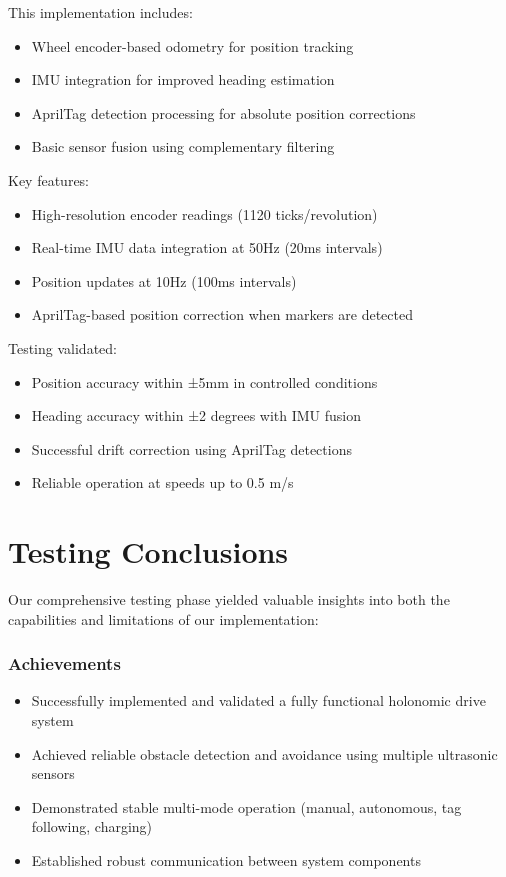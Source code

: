 \documentclass{article}
\begin{document}
This implementation includes:
\begin{itemize}
    \item Wheel encoder-based odometry for position tracking
    \item IMU integration for improved heading estimation
    \item AprilTag detection processing for absolute position corrections
    \item Basic sensor fusion using complementary filtering
\end{itemize}

Key features:
\begin{itemize}
    \item High-resolution encoder readings (1120 ticks/revolution)
    \item Real-time IMU data integration at 50Hz (20ms intervals)
    \item Position updates at 10Hz (100ms intervals)
    \item AprilTag-based position correction when markers are detected
\end{itemize}

Testing validated:
\begin{itemize}
    \item Position accuracy within ±5mm in controlled conditions
    \item Heading accuracy within ±2 degrees with IMU fusion
    \item Successful drift correction using AprilTag detections
    \item Reliable operation at speeds up to 0.5 m/s
\end{itemize}

\newpage
\section{Testing Conclusions}
Our comprehensive testing phase yielded valuable insights into both the capabilities and limitations of our implementation:

\subsubsection{Achievements}
\begin{itemize}
    \item Successfully implemented and validated a fully functional holonomic drive system
    \item Achieved reliable obstacle detection and avoidance using multiple ultrasonic sensors
    \item Demonstrated stable multi-mode operation (manual, autonomous, tag following, charging)
    \item Established robust communication between system components
\end{itemize}
\end{document}
